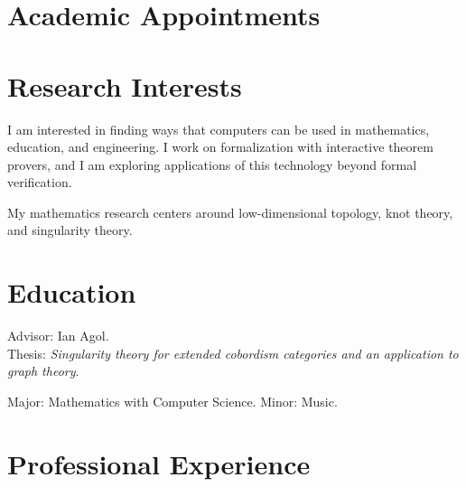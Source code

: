 \documentclass[11pt,letterpaper,roman]{moderncv}
\begin{document}
\maketitle
\vspace{-2em}

\section{Academic Appointments}



\section{Research Interests}

I am interested in finding ways that computers can be used in mathematics, education, and engineering.
I work on formalization with interactive theorem provers, and I am exploring applications of this technology beyond formal verification.

\vspace{0.5em}
My mathematics research centers around low-dimensional topology, knot theory, and singularity theory.


\section{Education}

{Advisor: Ian Agol.\\
Thesis: \emph{Singularity theory for extended cobordism categories and an application to graph theory}.}

{Major: Mathematics with Computer Science. Minor: Music.}

\section{Professional Experience}

\end{document}
